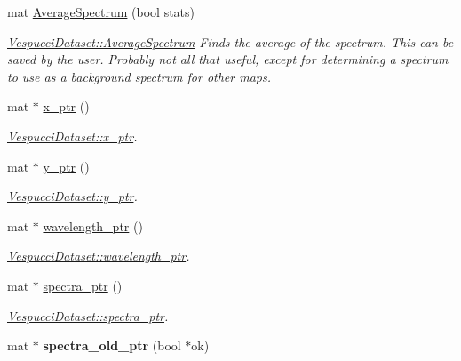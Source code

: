 \begin{DoxyCompactItemize}
mat \hyperlink{class_vespucci_dataset_a0b25d46d2ea17f59fbd9c2007d958d64}{Average\+Spectrum} (bool stats)
\begin{DoxyCompactList}\small\item\em \hyperlink{class_vespucci_dataset_a0b25d46d2ea17f59fbd9c2007d958d64}{Vespucci\+Dataset\+::\+Average\+Spectrum} Finds the average of the spectrum. This can be saved by the user. Probably not all that useful, except for determining a spectrum to use as a background spectrum for other maps. \end{DoxyCompactList}\item 
mat $\ast$ \hyperlink{class_vespucci_dataset_a64ac0dabcee669da58f55ae94bb63bc8}{x\+\_\+ptr} ()
\begin{DoxyCompactList}\small\item\em \hyperlink{class_vespucci_dataset_a64ac0dabcee669da58f55ae94bb63bc8}{Vespucci\+Dataset\+::x\+\_\+ptr}. \end{DoxyCompactList}\item 
mat $\ast$ \hyperlink{class_vespucci_dataset_ae3e3a13a4c77f575a64070765e613759}{y\+\_\+ptr} ()
\begin{DoxyCompactList}\small\item\em \hyperlink{class_vespucci_dataset_ae3e3a13a4c77f575a64070765e613759}{Vespucci\+Dataset\+::y\+\_\+ptr}. \end{DoxyCompactList}\item 
mat $\ast$ \hyperlink{class_vespucci_dataset_adb13350f6456bb09277e63a8b8d9a001}{wavelength\+\_\+ptr} ()
\begin{DoxyCompactList}\small\item\em \hyperlink{class_vespucci_dataset_adb13350f6456bb09277e63a8b8d9a001}{Vespucci\+Dataset\+::wavelength\+\_\+ptr}. \end{DoxyCompactList}\item 
mat $\ast$ \hyperlink{class_vespucci_dataset_ad91edadd2c2a7630929088d0b0c7fc19}{spectra\+\_\+ptr} ()
\begin{DoxyCompactList}\small\item\em \hyperlink{class_vespucci_dataset_ad91edadd2c2a7630929088d0b0c7fc19}{Vespucci\+Dataset\+::spectra\+\_\+ptr}. \end{DoxyCompactList}\item 
\hypertarget{class_vespucci_dataset_a6f71f24af359f3d61f2ecdbcc7cab396}{mat $\ast$ {\bfseries spectra\+\_\+old\+\_\+ptr} (bool $\ast$ok)}\label{class_vespucci_dataset_a6f71f24af359f3d61f2ecdbcc7cab396}


\end{DoxyCompactItemize}

